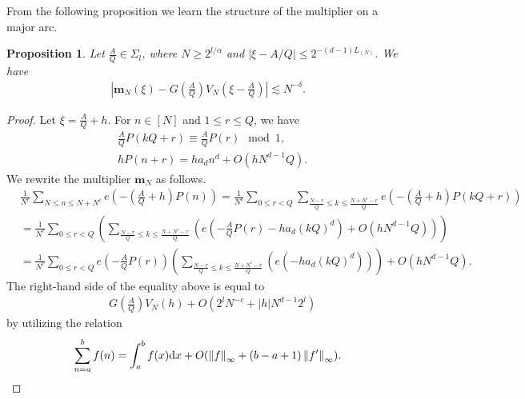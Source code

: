 \documentclass[12pt,leqno]{amsart}
\def\d{{\rm d}}
\newcounter{counter}
\newcounter{counter2}
\numberwithin{equation}{section}
\numberwithin{counter2}{section}
\newtheorem{proposition}[subsection]{Proposition}
\newcounter{theorem}
\theoremstyle{definition}
\theoremstyle{plain}
\newcommand{\de}{\delta}
\begin{document}
	From the following proposition we learn the structure of the multiplier on a major arc.
	\begin{proposition}\label{p:majorarcalldeg}
		Let $\frac{A}{Q} \in \Sigma_l$, where $ N \geq 2^{l/\alpha} $ and $|\xi - A/Q| \leq 2^{-(d-1)L_{(N)}} $. We have 
		\begin{align}\label{eq approx on major arcs}
			\left|	\mathbf{m}_N(\xi) -G\left (\frac{A}{Q}\right ) V_N \left( \xi - \frac{A}{Q}\right) \right|  \lesssim N^{-\delta}. 
		\end{align}
	\end{proposition}
	\begin{proof}
		Let $ \xi=\frac{A}{Q}+h$. For $n \in [N]$ and $1 \leq r \leq Q$, we have 
		\begin{align*}
			& \frac{A}{Q} P(kQ+r) \equiv \frac{A}{Q}P(r) \mod 1, \\
			& hP(n+r) =h a_dn^d+O\left(h N^{d-1}Q \right).
		\end{align*}
		We rewrite the multiplier $\mathbf{m}_N$ as follows. 
		\begin{align*}
			& \frac{1}{N^c} \sum_{N \leq n \leq N+N^c}e\left(- \left(\frac{A}{Q}+h\right) P(n) \right)=\frac{1}{N^c} \sum_{0 \leq r<Q} \sum_{ \frac{N-r}{Q} \leq k \leq \frac{N+N^c-r}{Q} } e\left(-  \left(\frac{A}{Q}+h\right) P(kQ+r)  \right) \\ 
			& = \frac{1}{N^c} \sum_{0 \leq r<Q} \left(\sum_{ \frac{N-r}{Q} \leq k \leq \frac{N+N^c-r}{Q} }\left(e\left( -\frac{A}{Q} P(r)-ha_d(kQ)^d \right) +O\left(hN^{d-1}Q\right)\right) \right) \\ 
			& =\frac{1}{N^c} \sum_{0 \leq r<Q}e\left(-\frac{A}{Q} P(r)\right) \left(\sum_{\frac{N-r}{Q} \leq k \leq \frac{N+N^c-r}{Q}}\left(e(-ha_d(kQ)^d)\right) \right)+ O\left(hN^{d-1}Q\right) . 
		\end{align*}
		The right-hand side of the equality above is equal to 
		\begin{align*}
			&  G\left (\frac{A}{Q}\right ) V_{N}(h)  + O\left(  2^l N^{-c} + |h| N^{d-1} 2^l  \right) 
		\end{align*}
		by utilizing the relation \[ \sum_{n=a}^bf(n)=\int_{a}^bf(x) \d x +O( \left \| f \right \|_{\infty}+(b-a+1) \left \| f' \right \|_{\infty} ).  \]

	\end{proof}
	
\end{document}
